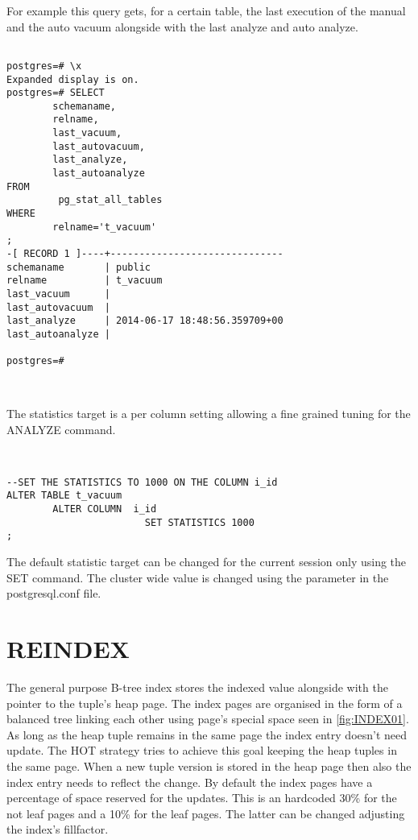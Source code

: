 For example this query gets, for a certain table,  the last execution of the manual and the auto vacuum 
alongside with the last analyze and auto analyze.

\begin{lstlisting}[style=pgsql]

postgres=# \x
Expanded display is on.
postgres=# SELECT
        schemaname,
        relname,
        last_vacuum,
        last_autovacuum,
        last_analyze,
        last_autoanalyze
FROM
         pg_stat_all_tables
WHERE
        relname='t_vacuum'
;
-[ RECORD 1 ]----+------------------------------
schemaname       | public
relname          | t_vacuum
last_vacuum      | 
last_autovacuum  | 
last_analyze     | 2014-06-17 18:48:56.359709+00
last_autoanalyze | 

postgres=# 



\end{lstlisting}


The statistics target is a per column setting allowing a fine grained tuning for the ANALYZE command.

\begin{lstlisting}[style=pgsql]


--SET THE STATISTICS TO 1000 ON THE COLUMN i_id
ALTER TABLE t_vacuum 
        ALTER COLUMN  i_id 
                        SET STATISTICS 1000
;

\end{lstlisting}

The default statistic target can be changed for the current session only using the SET command. The cluster 
wide value is changed using the parameter in the postgresql.conf file.

\section{REINDEX}\label{sec:REINDEX}
The general purpose B-tree index stores the indexed value alongside with the pointer to the 
tuple's heap page. The index pages are organised in the form of a balanced tree linking each other 
using page's special space seen in \ref{fig:INDEX01}. As long as the heap tuple remains in the same page
the index entry doesn't need update. The HOT strategy tries to achieve this goal keeping 
the heap tuples in the same page. When a new tuple version is stored in the heap page then also the index 
entry needs to reflect the change. By default the index pages have a percentage of space reserved for 
the updates. This is an hardcoded 30\% for the not leaf pages and a 10\% for the leaf 
pages. The latter can be changed adjusting the index's fillfactor.\newline

